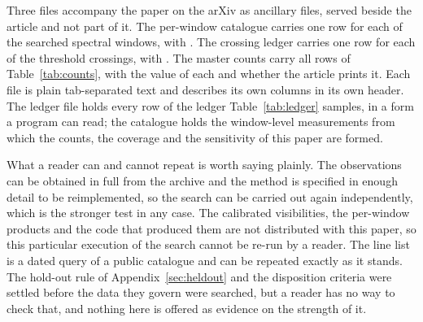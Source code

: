 Three files accompany the paper on the arXiv as ancillary files, served
beside the article and not part of it. The per-window catalogue
carries one row for each of the
\NWindows{} searched spectral windows, with \SiCatColList. The crossing ledger
carries one row for each of the \EvNCrossRaw{} threshold crossings, with
\SiLdgColList. The master counts carry all \MtCountRows{} rows of
Table~\ref{tab:counts}, with the value of each and whether the article prints
it. Each file is plain tab-separated text and describes its own columns
in its own header. The ledger file holds every row of the ledger
Table~\ref{tab:ledger} samples, in a form a program can read; the catalogue holds the window-level measurements from which the counts,
the coverage and the sensitivity of this paper are formed.

What a reader can and cannot repeat is worth saying plainly. The observations
can be obtained in full from the archive and the method is specified in enough
detail to be reimplemented, so the search can be carried out again
independently, which is the stronger test in any case. The calibrated
visibilities, the per-window products and the code that produced them are not
distributed with this paper, so this particular execution of the search cannot
be re-run by a reader. The line list is a dated query of a public catalogue
and can be repeated exactly as it stands. The hold-out rule of
Appendix~\ref{sec:heldout} and the disposition criteria were settled before
the data they govern were searched, but a reader has no way to check that,
and nothing here is offered as evidence on the strength of it.
